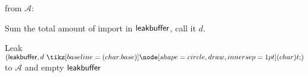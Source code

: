 \begin{bbox}[title={\textbf{Wrapper} $\mathcal{W}_{\msf{async}}$} ]
\OnInput {} from $\mathcal{A}$:
	\begin{ritemize}
	\item Sum the total amount of import in ${\mathsf {leakbuffer}}$, call it $d$.
	\item Leak $(\msf{leakbuffer},d \token)$ to $\mathcal{A}$ and empty ${\mathsf {leakbuffer}}$
	\end{ritemize}
\end{bbox}
